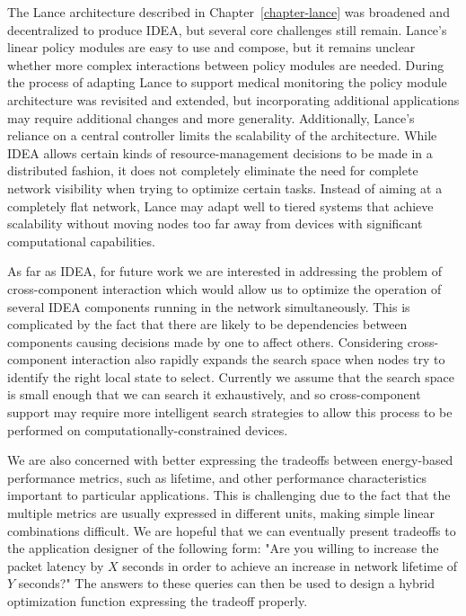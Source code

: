 The Lance architecture described in Chapter~\ref{chapter-lance} was broadened
and decentralized to produce IDEA, but several core challenges still remain.
Lance's linear policy modules are easy to use and compose, but it remains
unclear whether more complex interactions between policy modules are needed.
During the process of adapting Lance to support medical monitoring the policy
module architecture was revisited and extended, but incorporating additional
applications may require additional changes and more generality.
Additionally, Lance's reliance on a central controller limits the scalability
of the architecture. While IDEA allows certain kinds of resource-management
decisions to be made in a distributed fashion, it does not completely
eliminate the need for complete network visibility when trying to optimize
certain tasks. Instead of aiming at a completely flat network, Lance may
adapt well to tiered systems that achieve scalability without moving nodes
too far away from devices with significant computational capabilities.

As far as IDEA, for future work we are interested in addressing the problem
of cross-component interaction which would allow us to optimize the operation
of several IDEA components running in the network simultaneously. This is
complicated by the fact that there are likely to be dependencies between
components causing decisions made by one to affect others. Considering
cross-component interaction also rapidly expands the search space when nodes
try to identify the right local state to select. Currently we assume that the
search space is small enough that we can search it exhaustively, and so
cross-component support may require more intelligent search strategies to
allow this process to be performed on computationally-constrained devices.

We are also concerned with better expressing the tradeoffs between
energy-based performance metrics, such as lifetime, and other performance
characteristics important to particular applications. This is challenging due
to the fact that the multiple metrics are usually expressed in different
units, making simple linear combinations difficult. We are hopeful that we
can eventually present tradeoffs to the application designer of the following
form: "Are you willing to increase the packet latency by $X$ seconds in order
to achieve an increase in network lifetime of $Y$ seconds?" The answers to
these queries can then be used to design a hybrid optimization function
expressing the tradeoff properly.

